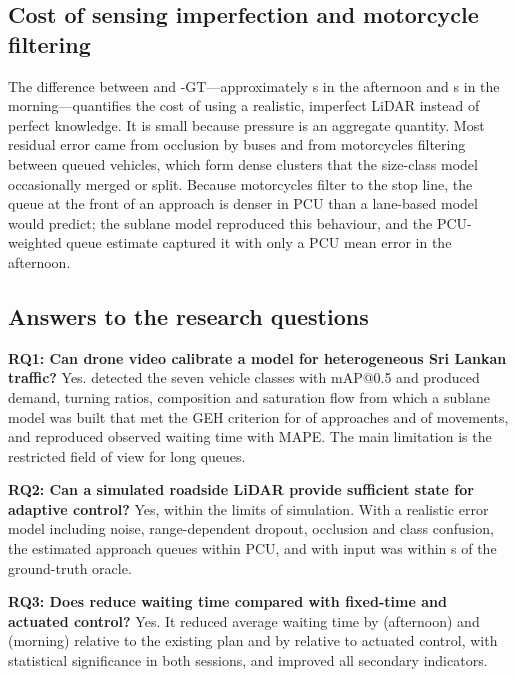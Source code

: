 \subsection{Cost of sensing imperfection and motorcycle filtering}

The difference between \prism{} and \prism{}-GT---approximately  s in the afternoon and  s in the morning---quantifies the cost of using a realistic, imperfect LiDAR instead of perfect knowledge. It is small because pressure is an aggregate quantity. Most residual error came from occlusion by buses and from motorcycles filtering between queued vehicles, which form dense clusters that the size-class model occasionally merged or split. Because motorcycles filter to the stop line, the queue at the front of an approach is denser in PCU than a lane-based model would predict; the sublane model reproduced this behaviour, and the PCU-weighted queue estimate captured it with only a  PCU mean error in the afternoon.

\subsection{Answers to the research questions}

\textbf{RQ1: Can drone video calibrate a \sumo{} model for heterogeneous Sri Lankan traffic?} Yes. \dtx{} detected the seven vehicle classes with  mAP@0.5 and produced demand, turning ratios, composition and saturation flow from which a sublane model was built that met the GEH criterion for  of approaches and  of movements, and reproduced observed waiting time with  MAPE. The main limitation is the restricted field of view for long queues.

\textbf{RQ2: Can a simulated roadside LiDAR provide sufficient state for adaptive control?} Yes, within the limits of simulation. With a realistic error model including noise, range-dependent dropout, occlusion and class confusion, the \vls{} estimated approach queues within  PCU, and \prism{} with \vls{} input was within  s of the ground-truth oracle.

\textbf{RQ3: Does \prism{} reduce waiting time compared with fixed-time and actuated control?} Yes. It reduced average waiting time by  (afternoon) and  (morning) relative to the existing plan and by  relative to actuated control, with statistical significance in both sessions, and improved all secondary indicators.

